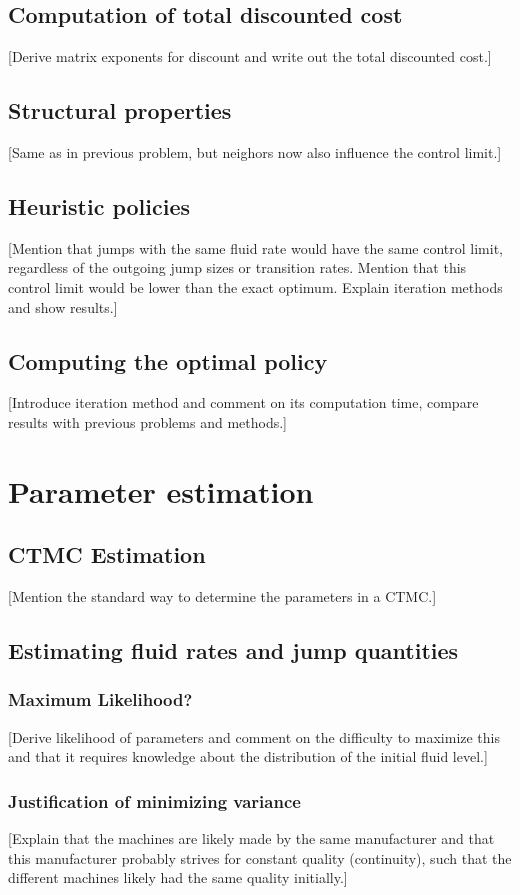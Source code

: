 \section{Computation of total discounted cost}
[Derive matrix exponents for discount and write out the total discounted cost.]
\section{Structural properties}
[Same as in previous problem, but neighors now also influence the control limit.]
\section{Heuristic policies}
[Mention that jumps with the same fluid rate would have the same control limit, regardless of the outgoing jump sizes or transition rates. Mention that this control limit would be lower than the exact optimum. Explain iteration methods and show results.]
\section{Computing the optimal policy}
[Introduce iteration method and comment on its computation time, compare results with previous problems and methods.]

\chapter{Parameter estimation}
\section{CTMC Estimation}
[Mention the standard way to determine the parameters in a CTMC.]
\section{Estimating fluid rates and jump quantities}
\subsection{Maximum Likelihood?}
[Derive likelihood of parameters and comment on the difficulty to maximize this and that it requires knowledge about the distribution of the initial fluid level.]
\subsection{Justification of minimizing variance}
[Explain that the machines are likely made by the same manufacturer and that this manufacturer probably strives for constant quality (continuity), such that the different machines likely had the same quality initially.]
